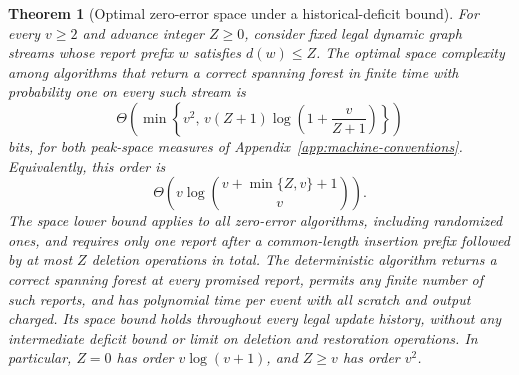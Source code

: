 \documentclass[11pt,letterpaper]{article}
\newtheorem{theorem}{Theorem}[section]
\numberwithin{equation}{section}
\begin{document}
\begin{theorem}[Optimal zero-error space under a historical-deficit bound]
\label{thm:zero-error-implementation}
For every $v\ge2$ and advance integer $Z\ge0$, consider fixed legal dynamic graph streams whose report prefix $w$ satisfies $d(w)\le Z$.
The optimal space complexity among algorithms that return a correct spanning forest in finite time with probability one on every such stream is
\begin{equation}
\Theta\!\left(
  \min\left\{v^2,\,
    v(Z+1)\log\left(1+\frac v{Z+1}\right)\right\}\right)
 \label{eq:se1}
\end{equation}
bits, for both peak-space measures of Appendix~\ref{app:machine-conventions}.
Equivalently, this order is
\begin{equation}
\Theta\!\left(
  v\log\binom{v+\min\{Z,v\}+1}{v}\right).
 \label{eq:se2}
\end{equation}
The space lower bound applies to all zero-error algorithms, including randomized ones, and requires only one report after a common-length insertion prefix followed by at most $Z$ deletion operations in total.
The deterministic algorithm returns a correct spanning forest at every promised report, permits any finite number of such reports, and has polynomial time per event with all scratch and output charged.
Its space bound holds throughout every legal update history, without any intermediate deficit bound or limit on deletion and restoration operations.
In particular, $Z=0$ has order $v\log(v+1)$, and $Z\ge v$ has order $v^2$.
\end{theorem}
\end{document}
